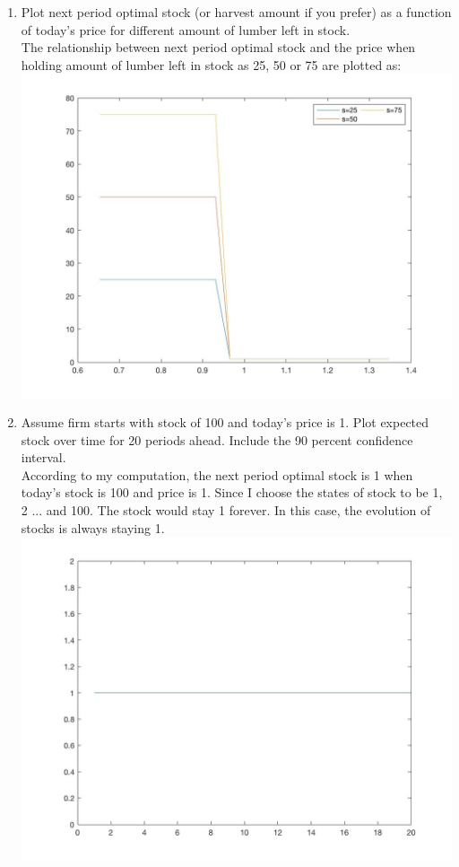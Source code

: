 \documentclass[11pt]{article}
\begin{document}
\begin{enumerate}
\item Plot next period optimal stock (or harvest amount if you prefer) as a function of today's price for different amount of lumber left in stock.\\[2em]

The relationship between next period optimal stock and the price when holding amount of lumber left in stock as 25, 50 or 75 are plotted as:\\
    \includegraphics[scale=0.2]{spolp.jpg}


\item Assume firm starts with stock of 100 and today's price is 1. Plot expected stock over time for 20 periods ahead. Include the 90 percent confidence interval. \\[2em]

According to my computation, the next period optimal stock  is 1 when today's stock is 100 and price is 1. Since I choose the states of stock to be 1, 2 ... and 100. The stock would stay 1 forever. In this case, the evolution of stocks is always staying 1. \\
 \includegraphics[scale=0.2]{spath.jpg}


\end{enumerate}
\end{document}
